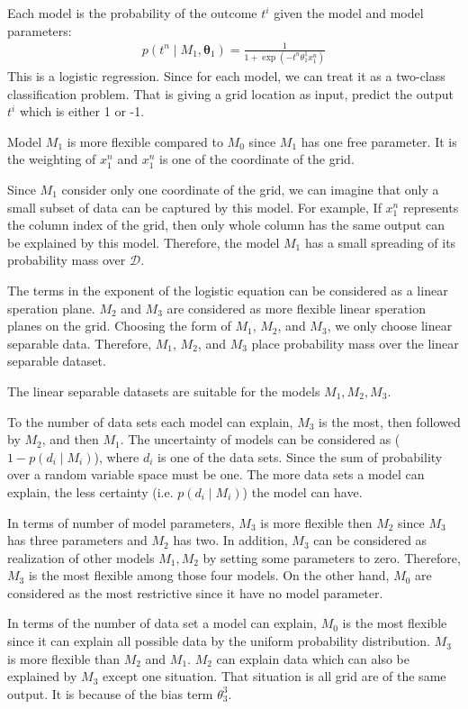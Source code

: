 \documentclass[12pt]{article}
\newenvironment{question}[2][Question]{\begin{trivlist}
\kern10pt
\item[\hskip \labelsep {\bfseries #1}\hskip \labelsep {\bfseries #2.}]}{\end{trivlist}}
\begin{document}
\begin{question}{18}
Each model is the probability of the outcome $t^i$ given the model and model
parameters:
\begin{align*}
  p(t^n\mid M_1, \bm{\theta}_1) = \frac{1}{1 + \exp(-t^n\theta^1_1 x^n_1)}
\end{align*}
This is a logistic regression. Since for each model, we can treat it as a 
two-class classification problem. That is giving a grid location as input, 
predict the output $t^i$ which is either 1 or -1.

Model $M_1$ is more flexible compared to $M_0$ since $M_1$ has one 
free parameter. It is the weighting of $x^n_1$ and $x^n_1$ is one of the coordinate
of the grid.

Since $M_1$ consider only one coordinate of the grid, we can imagine that only a 
small subset of data can be captured by this model. 
For example, If $x^n_1$ represents the column index of the grid, then only whole
column has the same output can be explained by this model.
Therefore, the model $M_1$ has a small spreading of its probability mass over 
$\mathcal{D}$.
\end{question}

\begin{question}{19}
The terms in the exponent of the logistic equation can be considered as 
a linear speration plane.
$M_2$ and $M_3$ are considered as more flexible linear speration planes on the grid.
Choosing the form of $M_1$, $M_2$, and $M_3$, we only choose linear separable data.
Therefore, $M_1$, $M_2$, and $M_3$ place probability mass over the linear separable
dataset.

The linear separable datasets are suitable for the models $M_1, M_2, M_3$.

To the number of data sets each model can explain, $M_3$ is the most, then followed
by $M_2$, and then $M_1$.
The uncertainty of models can be considered as ($1 - p(d_i\mid M_i)$),
where $d_i$ is one of the data sets.
Since the sum of probability over a random variable space must be one. The more
data sets a model can explain, the less certainty (i.e. $p(d_i\mid M_i)$)
the model can have.

In terms of number of model parameters, $M_3$ is more flexible then $M_2$ since
$M_3$ has three parameters and $M_2$ has two.
In addition, $M_3$ can be considered as realization of other models 
${M_1, M_2}$ by setting some parameters to zero.
Therefore, $M_3$ is the most flexible among those four models.
On the other hand, $M_0$ are considered as the most restrictive since
it have no model parameter.

In terms of the number of data set a model can explain, $M_0$ is the most
flexible since it can explain all possible data by the uniform probability 
distribution.
$M_3$ is more flexible than $M_2$ and $M_1$. $M_2$ can explain data which can 
also be explained by $M_3$ except one situation. That situation is all
grid are of the same output. It is because of the bias term $\theta^3_3$.
\end{question}
\end{document}
